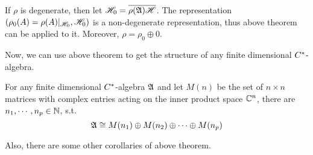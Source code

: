 \begin{rem}
	If $\rho$ is degenerate, then let $\mathscr{H}_0 = \overline{\rho(\mathfrak{A}) \mathscr{H}}$. The representation $(\rho_0(A) = \rho(A)|_{\mathscr{H}_0}, \mathscr{H}_0)$ is a non-degenerate representation, thus above theorem can be applied to it. Moreover, $\rho = \rho_0 \oplus 0$. 
\end{rem}

Now, we can use above theorem to get the structure of any finite dimensional $C^{*}$-algebra.
\begin{cor}
	For any finite dimensional $C^{*}$-algebra $\mathfrak{A}$ and let $M(n)$ be the set of $n \times n$ matrices with complex entries acting on the inner product space $\mathbb{C}^{n}$, there are $n_1,\cdots,n_p \in \mathbb{N}$, s.t.
	\begin{equation*}
		\mathfrak{A} \cong M(n_1) \oplus M(n_2) \oplus \cdots \oplus M(n_p)
	\end{equation*}
\end{cor}

Also, there are some other corollaries of above theorem.


